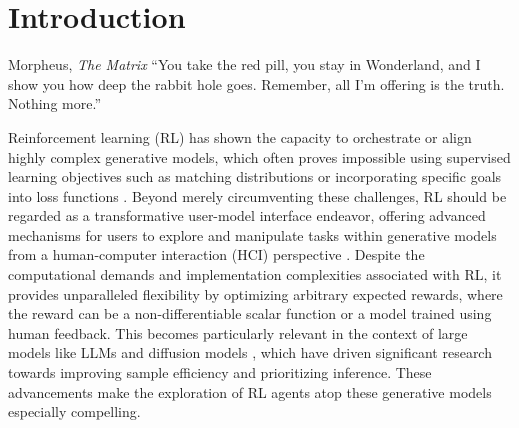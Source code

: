 \chapter{Introduction}


\begin{chapquote}{Morpheus, \textit{The Matrix}}
``You take the red pill, you stay in Wonderland, and I show you how deep the rabbit hole goes. Remember, all I'm offering is the truth. Nothing more.''
\end{chapquote}

Reinforcement learning (RL) has shown the capacity to orchestrate or align highly complex generative models, which often proves impossible using supervised learning objectives such as matching distributions or incorporating specific goals into loss functions  \cite{ouyang2022training,lee2023aligning, fan2023dpokreinforcementlearningfinetuning, black2023training, deng2024prdpproximalrewarddifference}. Beyond merely circumventing these challenges, RL should be regarded as a transformative user-model interface endeavor, offering advanced mechanisms for users to explore and manipulate tasks within generative models from a human-computer interaction (HCI) perspective \cite{Du2023-fg, Pommeranz-hci, 10.1145/3357236.3395525}. 
Despite the computational demands and implementation complexities associated with RL, it provides unparalleled flexibility by optimizing arbitrary expected rewards, where the reward can be a non-differentiable scalar function or a model trained using human feedback. This becomes particularly relevant in the context of large models like LLMs \cite{wan2024efficientlargelanguagemodels} and diffusion models \cite{karras2022elucidatingdesignspacediffusionbased, song2021scorebasedgenerativemodelingstochastic, Salimans2022ProgressiveDF, watson2021learningefficientlysamplediffusion, watson2022learningfastsamplersdiffusion}, which have driven significant research towards improving sample efficiency and prioritizing inference. These advancements make the exploration of RL agents atop these generative models especially compelling. \\

